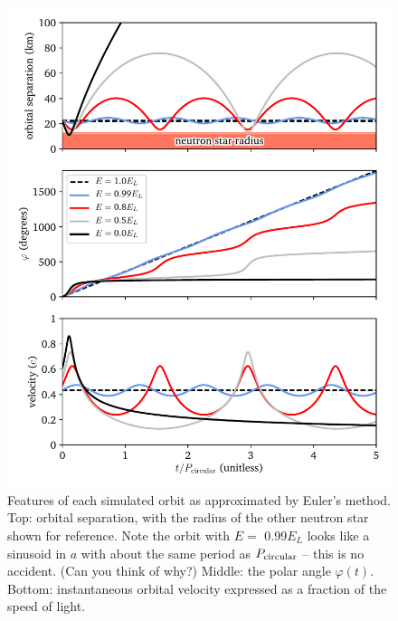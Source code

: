 \documentclass[11pt]{article}
\begin{document}
\begin{figure}[!h]
\centering
\includegraphics[scale=1]{keplerian_orbit/orbit_parameters.pdf}
\caption{\label{fig:simulated_parameters} Features of each simulated orbit as approximated by Euler's method. Top: orbital separation, with the radius of the other neutron star shown for reference. Note the orbit with $E=$ 0.99$E_L$ looks like a sinusoid in $a$ with about the same period as $P_{\rm circular}$ -- this is no accident. (Can you think of why?) Middle: the polar angle $\varphi(t)$. Bottom: instantaneous orbital velocity expressed as a fraction of the speed of light.}
\end{figure}
\end{document}
